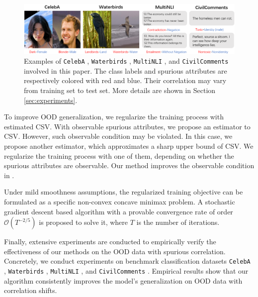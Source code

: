 \documentclass{article} %
\newcommand{\cO}{\mathcal{O}}
\begin{document}
	\begin{figure}[t]\centering
		\vspace{-0.5in}
		\includegraphics[width=1\textwidth]{./pic/dataset_new.png}
		\vspace{-0.22in}
		\caption{Examples of \texttt{CelebA} \citep{liu2015deep}, \texttt{Waterbirds} \citep{sagawa2019distributionally}, \texttt{MultiNLI} \citep{williams2018broad}, and \texttt{CivilComments} \citep{borkan2019nuanced} involved in this paper. The class labels and spurious attributes are respectively colored with red and blue. Their correlation may vary from training set to test set. More details are shown in Section \ref{sec:experiments}.}
		\label{fig:waterbirds}
		\vspace{-0.3in}
	\end{figure} 
	\par
	To improve OOD generalization, we regularize the training process with estimated CSV. With observable spurious attributes, we propose an estimator to CSV. However, such observable condition may be violated. In this case, we propose another estimator, which approximates a sharp upper bound of CSV. We regularize the training process with one of them, depending on whether the spurious attributes are observable. Our method improves the observable condition in \citep{sagawa2019distributionally}.
	\par
	Under mild smoothness assumptions, the regularized training objective can be formulated as a specific non-convex concave minimax problem. A stochastic gradient descent based algorithm with a provable convergence rate of order $\cO(T^{-2/5})$ is proposed to solve it, where $T$ is the number of iterations. %
	\par
	Finally, extensive experiments are conducted to empirically verify the effectiveness of our methods on the OOD data with spurious correlation. Concretely, we conduct experiments on benchmark classification datasets \texttt{CelebA} \citep{liu2015deep}, \texttt{Waterbirds} \citep{sagawa2019distributionally}, \texttt{MultiNLI} \citep{williams2018broad}, and \texttt{CivilComments} \citep{borkan2019nuanced}. Empirical results show that our algorithm consistently improves the model's generalization on OOD data with correlation shifts. 
\end{document}
